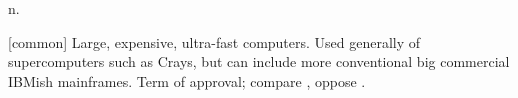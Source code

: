  n.

[common] Large, expensive, ultra-fast computers. Used generally of
 supercomputers such as Crays, but can
include more conventional big commercial IBMish mainframes. Term of
approval; compare , oppose .

